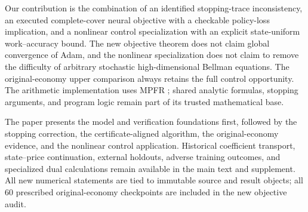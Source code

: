Our contribution is the combination of an identified stopping-trace inconsistency, an executed complete-cover neural objective with a checkable policy-loss implication, and a nonlinear control specialization with an explicit state-uniform work--accuracy bound. The new objective theorem does not claim global convergence of Adam, and the nonlinear specialization does not claim to remove the difficulty of arbitrary stochastic high-dimensional Bellman equations. The original-economy upper comparison always retains the full control opportunity. The arithmetic implementation uses MPFR \citep{FousseEtAl2007}; shared analytic formulas, stopping arguments, and program logic remain part of its trusted mathematical base.

The paper presents the model and verification foundations first, followed by the stopping correction, the certificate-aligned algorithm, the original-economy evidence, and the nonlinear control application. Historical coefficient transport, state--price continuation, external holdouts, adverse training outcomes, and specialized dual calculations remain available in the main text and supplement. All new numerical statements are tied to immutable source and result objects; all 60 prescribed original-economy checkpoints are included in the new objective audit.
